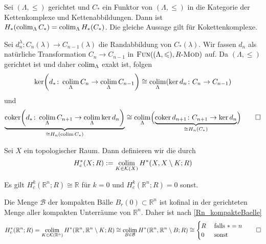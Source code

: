 \begin{korollar}[{name=[Homologie vertauscht mit Kolimiten]}]
	Sei $(\Lambda,\le)$ gerichtet und $C_*$ ein Funktor von $(\Lambda,\le)$ in die Kategorie der Kettenkomplexe und Kettenabbildungen. 
	Dann ist $H_*(\operatorname*{colim}_\Lambda C_*) = \operatorname*{colim}_\Lambda H_*(C_*)$. 
	Die gleiche Aussage gilt für Kokettenkomplexe.
\end{korollar}
\begin{beweis}
	Sei $d^{\lambda}_n \colon C_n(\lambda) \to C_{n-1}(\lambda)$ die Randabbildung von $C_*(\lambda)$.
	Wir fassen $d_n$ als natürliche Transformation $C_n \to C_{n-1}$ in $\FUN \enbrace*{(\Lambda,\le),R\text{-}\MOD}$ auf. 
	Da $(\Lambda,\le)$ gerichtet ist und daher $\operatorname*{colim}_\Lambda$ exakt ist, folgen
	\[
		\ker \enbrace*{d_* \colon \colim_{\Lambda} C_n \to \colim_\Lambda C_{n-1}} \cong \colim_\Lambda \enbrace*{\ker d_n \colon C_n \to C_{n-1} }
	\]
	und 
	\[
		\Underbrace{\coker \enbrace*{ d_{*} \colon \colim_\Lambda C_{n+1} \to \colim_\Lambda \ker d_n}}{ \cong H_n(\colim C_*)}
		\cong \colim_\Lambda \enbrace[\Big]{ \Underbrace{\coker d_{n+1} \colon C_{n+1} \to \ker d_n}{\cong H_n(C_*)}} \qedhere
	\]
\end{beweis}

\begin{definition}[{name=[singuläre Kohomologie mit kompaktem Träger]}]
	Sei $X$ ein topologischer Raum. Dann definieren wir die  durch
	\[
		H^*_c(X;R) := \operatorname*{colim}_{K \in \mathcal{K}(X)} H^*(X,X \setminus K;R)
	\]
\end{definition}

\begin{beispiel}[{name=[Kohomologie mit kompaktem Träger des des euklidischen Raumes]}]
	Es gilt $H^k_c(\mathbb{R}^n;R) \cong \mathbb{R}$ für $k=0$ und $H^k_c(\mathbb{R}^n;R)=0$ sonst. 
\end{beispiel}
\begin{beweis}
	Die Menge $\mathcal{B}$ der kompakten Bälle $B_r(0) \subset \mathbb{R}^n$ ist kofinal in der gerichteten Menge aller kompakten Unterräume von $\mathbb{R}^n$.
	Daher ist nach \autoref{Rn_kompakteBaelle}
	\[
		H^*_c(\mathbb{R}^n;R) = \colim_{K \in \mathcal{K}(\mathbb{R}^n)} H^* \enbrace*{\mathbb{R}^n , \mathbb{R}^n \setminus K;R} 
		\cong \colim_{B \in \mathcal{B}} H^* \enbrace*{\mathbb{R}^n,\mathbb{R}^n \setminus B;R} \cong \begin{cases}
			R &\text{ falls }*=n\\
			0 &\text{ sonst }
		\end{cases} \qedhere
	\]
\end{beweis}


